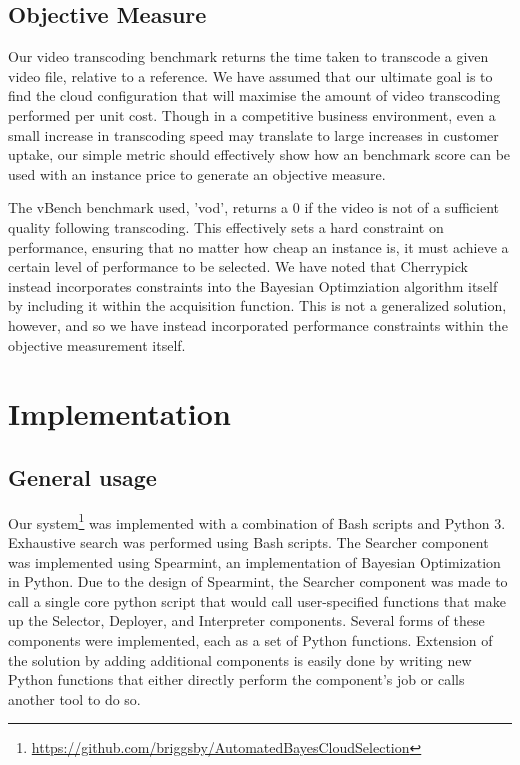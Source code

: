 \documentclass{report}
\begin{document}
\section{Objective Measure}
Our video transcoding benchmark returns the time taken to transcode a given video file, relative to a reference. We have assumed that our ultimate goal is to find the cloud configuration that will maximise the amount of video transcoding performed per unit cost. Though in a competitive business environment, even a small increase in transcoding speed may translate to large increases in customer uptake, our simple metric should effectively show how an benchmark score can be used with an instance price to generate an objective measure.

The vBench benchmark used, 'vod', returns a 0 if the video is not of a sufficient quality following transcoding. This effectively sets a hard constraint on performance, ensuring that no matter how cheap an instance is, it must achieve a certain level of performance to be selected.
We have noted that Cherrypick\cite{Alipourfard2017} instead incorporates constraints into the Bayesian Optimziation algorithm itself by including it within the acquisition function. This is not a generalized solution, however, and so we have instead incorporated performance constraints within the objective measurement itself.

\chapter{Implementation}
\section{General usage}
Our system\footnote{\url{https://github.com/briggsby/AutomatedBayesCloudSelection}} was implemented with a combination of Bash scripts and Python 3. Exhaustive search was performed using Bash scripts. The Searcher component was implemented using Spearmint\cite{Snoek2012}, an implementation of Bayesian Optimization in Python. Due to the design of Spearmint, the Searcher component was made to call a single core python script that would call user-specified functions that make up the Selector, Deployer, and Interpreter components. Several forms of these components were implemented, each as a set of Python functions. Extension of the solution by adding additional components is easily done by writing new Python functions that either directly perform the component's job or calls another tool to do so.
\end{document}
